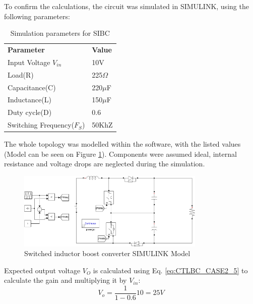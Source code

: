 To confirm the calculations, the circuit was simulated in SIMULINK, using the following parameters: 

\begin{table}[H]
\begin{center}
\caption {Simulation parameters for SIBC} \label{tab:CTLBC} 
\begin{tabular}{|l|l|}
\cline{1-2}
\textbf{Parameter} & \textbf{Value}  \\ \cline{1-2}
Input Voltage $V_{in}$          &      10V   \\ \cline{1-2}
Load(R)   & 225$\Omega$           \\ \cline{1-2}
Capacitance(C)          &       220$\mu$F     \\ \cline{1-2}
Inductance(L)          &      150$\mu$F      \\ \cline{1-2}
Duty cycle(D)          &     0.6       \\ \cline{1-2}
Switching Frequency($F_S$)          &      50KhZ      \\ \cline{1-2}
\end{tabular}
\end{center}
\end{table}

The whole topology was modelled within the software, with the listed values (Model can be seen on Figure \ref{fig:Model_CTLBC}). Components were assumed ideal, internal resistance and voltage drops are neglected during the simulation. 

\begin{figure} [H]
   \centering
   \includegraphics[width=0.8\textwidth]{figures/dConventionalThreeLevelBC/Model_CTLBC.pdf}
    \caption{Switched inductor boost converter SIMULINK Model}
	\label{fig:Model_CTLBC}
\end{figure}

Expected output voltage $V_O$ is calculated using Eq. \ref{eq:CTLBC_CASE2_5} to calculate the gain and multiplying it by $V_{in}$: 
\begin{equation}
	{V_o}= \frac{1}{1-0.6}10=25V
	\label{eq:Simulation_CTLBC}
\end{equation}

